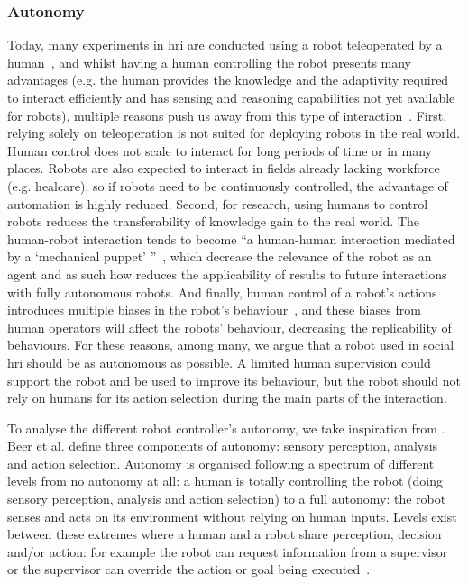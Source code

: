 \subsubsection{Autonomy}
	Today, many experiments in \gls{hri} are conducted using a robot teleoperated by a human~\citep{riek2012wizard,baxter2016characterising}, and whilst having a human controlling the robot presents many advantages (e.g. the human provides the knowledge and the adaptivity required to interact efficiently and has sensing and reasoning capabilities not yet available for robots), multiple reasons push us away from this type of interaction~\citep{thill2012robot}. First, relying solely on teleoperation is not suited for deploying robots in the real world. Human control does not scale to interact for long periods of time or in many places. Robots are also expected to interact in fields already lacking workforce (e.g. healcare), so if robots need to be continuously controlled, the advantage of automation is highly reduced. Second, for research, using humans to control robots reduces the transferability of knowledge gain to the real world. The human-robot interaction tends to become ``a human-human interaction mediated by a `mechanical puppet' ''~\citep{baxter2016characterising}, which decrease the relevance of the robot as an agent and as such how reduces the applicability of results to future interactions with fully autonomous robots. And finally, human control of a robot's actions introduces multiple biases in the robot's behaviour~\citep{howley2014effects}, and these biases from human operators will affect the robots' behaviour, decreasing the replicability of behaviours. For these reasons, among many, we argue that a robot used in social \gls{hri} should be as autonomous as possible. A limited human supervision could support the robot and be used to improve its behaviour, but the robot should not rely on humans for its action selection during the main parts of the interaction. 
		
    To analyse the different robot controller's autonomy, we take inspiration from \citet{beer2014toward}. Beer et al. define three components of autonomy: sensory perception, analysis and action selection. Autonomy is organised following a spectrum of different levels from no autonomy at all: a human is totally controlling the robot (doing sensory perception, analysis and action selection) to a full autonomy: the robot senses and acts on its environment without relying on human inputs. Levels exist between these extremes where a human and a robot share perception, decision and/or action: for example the robot can request information from a supervisor or the supervisor can override the action or goal being executed~\citep{sheridan1978human}.
    
